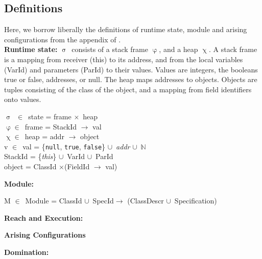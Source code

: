\documentclass[a4paper,11pt, twoside,twocolumn]{article}
\newenvironment{logic}[1][null]
{\begin{flushleft} \small \label{#1}}
{\end{flushleft}}
\newcommand{\loin}{$\in$}
\newcommand{\losigma}{$\upsigma$}
\newcommand{\lochi}{$\upchi$}
\newcommand{\lophi}{$\upvarphi$}
\newcommand{\locup} {$\cup$}
\newcommand{\lotimes} {$\times$}
\newcommand{\ablock} {\null\qquad}
\begin{document}
\subsection{Definitions}\noindent
Here, we borrow liberally the definitions of runtime state, module and arising configurations from the appendix of \cite{drossopoulou2015b}.\\
\textbf{Runtime state:}
 \losigma\ consists of a stack frame \lophi, and a heap \lochi. A stack frame is a mapping from receiver (this) to its address, and from the local variables (VarId) and parameters (ParId) to their values. Values are integers, the booleans true or false, addresses, or null. The heap maps addresses to objects. Objects are tuples consisting of the class of the object, and a mapping from field identifiers onto values.
\begin{logic}[Runtime state]
\losigma\ \loin\ state = frame \lotimes\ heap \\
\lophi \loin\ frame = StackId $\rightarrow$ val \\
\lochi \loin\ heap = addr $\rightarrow$ object \\
v \loin\ val = \{\texttt{null}, \texttt{true}, \texttt{false}\} \locup\ \textit{addr} \locup\ $\mathbb{N}$ \\
StackId = \{\textit{this}\} \locup\ VarId \locup\ ParId \\
object = ClassId \lotimes (FieldId $\rightarrow$ val)
\end{logic}
\textbf{Module:}
\begin{logic}[Module]
M \loin\ Module = ClassId \locup\ SpecId\linebreak\ablock\qquad\qquad\quad $\rightarrow$ \linebreak
\ablock \qquad \qquad \quad (ClassDescr \locup\ Specification)
\end{logic}

\textbf{Reach and Execution:}\\
\begin{logic}[Reach and Execution]\end{logic}



\textbf{Arising Configurations}\\
\begin{logic}[Arising]\end{logic}



\textbf{Domination:}\\
\begin{logic}[Domination]\end{logic}
\end{document}
